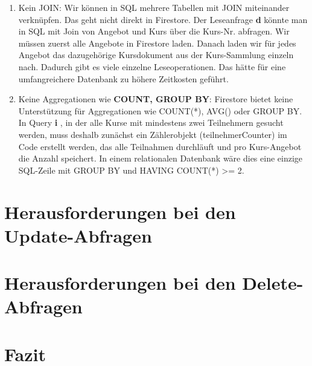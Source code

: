 \documentclass[12pt,a4paper%
              ,oneside     %
              ,titlepage
              ,DIV=13
              ,headinclude
              ,footinclude=false%
              ,cleardoublepage=empty%
              ,parskip=half,
              BCOR=0mm,
              ]{scrreprt}
\begin{document}
\begin{enumerate}
    \item  Kein JOIN: Wir können in SQL mehrere Tabellen mit JOIN miteinander verknüpfen. Das geht nicht direkt in Firestore. Der Leseanfrage \textbf{d} könnte man in SQL mit Join von Angebot und Kurs über die Kurs-Nr. abfragen. Wir müssen zuerst alle Angebote in Firestore laden. Danach laden wir für jedes Angebot das dazugehörige Kursdokument aus der Kurs-Sammlung einzeln nach. Dadurch gibt es viele einzelne Leseoperationen. Das hätte für eine umfangreichere Datenbank zu höhere Zeitkosten geführt.

    \item Keine Aggregationen wie \textbf{COUNT, GROUP BY}: Firestore bietet keine Unterstützung für Aggregationen wie COUNT(*), AVG() oder GROUP BY. In Query \textbf{i} , in der alle Kurse mit mindestens zwei Teilnehmern gesucht werden, muss deshalb zunächst ein Zählerobjekt (teilnehmerCounter) im Code erstellt werden, das alle Teilnahmen durchläuft und pro Kurs-Angebot die Anzahl speichert. In einem relationalen Datenbank wäre dies eine einzige SQL-Zeile mit GROUP BY und HAVING COUNT(*) >= 2.
\end{enumerate}









\chapter{Herausforderungen bei den Update-Abfragen}
\chapter{Herausforderungen bei den Delete-Abfragen}
\chapter{Fazit}


\appendix




\renewcommand{\bibfont}{\footnotesize}
\printbibliography[title={Literaturverzeichnis}, 
                   heading=bibintoc]


{ %
\printindex
}
\end{document}
